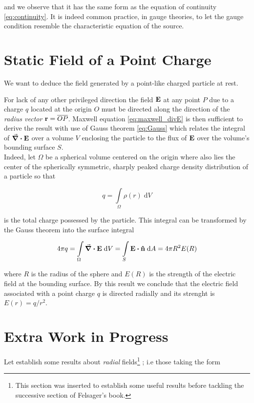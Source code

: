 and we observe that it has the same form as the equation of continuity \ref{eq:continuity}. It is indeed common practice, in gauge theories, to let the gauge condition resemble the characteristic equation of the source. 

\section{Static Field of a Point Charge} 
We want to deduce the field generated by a point-like charged particle at rest. 

For lack of any other privileged direction the field $\vb{E}$ at any point $P$ due to a charge $q$ located at the origin $O$ must be directed along the direction of the \textit{radius vector} $\vb{r} = \overline{OP}$. Maxwell equation \ref{eq:maxwell_divE} is then sufficient to derive the result with use of Gauss theorem \ref{eq:Gauss} which relates the integral of $\div{\vb{E}}$ over a volume $V$ enclosing the particle to the flux of $\vb{E}$ over the volume's bounding surface $S$. \\

Indeed, let $\Omega$ be a spherical volume centered on the origin where also lies the center of the spherically symmetric, sharply peaked charge density distribution of a particle so that 

\begin{equation}
q = \int\limits_{\Omega} \rho(r) \; \mathrm{d}V 
\end{equation}

is the total charge possessed by the particle. This integral can be transformed by the Gauss theorem into the surface integral 

\begin{equation}
4 \pi q = \int\limits_{\Omega}\div{\vb{E}} \; \mathrm{d}V = \int\limits_{S}\vb{E} \vdot \vu{n} \; \mathrm{d}A = 4 \pi R^2 E(R)
\end{equation}

where $R$ is the radius of the sphere and $E(R)$ is the strength of the electric field at the bounding surface. By this result we conclude that the electric field associated with a point charge $q$ is directed radially and its strenght is
$E(r) = q/r^2$.



\section{Extra Work in Progress} 
Let establish some results about \textit{radial} fields\footnote{This section was inserted to establish some useful results before tackling the successive section of Felsager's book.} ; i.e those taking the form 

